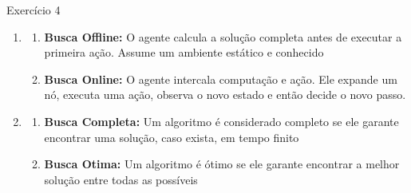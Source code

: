 \documentclass[a4paper,11pt]{article}
\theoremstyle{definition}
\theoremstyle{plain}
\theoremstyle{remark}
\newcounter{questao}[section]
\begin{document}
\begin{questaoManually}{Exercício 4}
\begin{enumerate}[label=\Alph*]
    \item
    \begin{enumerate}[label=\arabic*.]
      \item \textbf{Busca Offline:} O agente calcula a solução completa antes de executar a primeira ação. Assume um ambiente estático e conhecido
      \item \textbf{Busca Online:} O agente intercala computação e ação. Ele expande um nó, executa uma ação, observa o novo estado e então decide o novo passo.
    \end{enumerate}

    \item
    \begin{enumerate}[label=\arabic*.]
      \item \textbf{Busca Completa:} Um algoritmo é considerado completo se ele garante encontrar uma solução, caso exista, em tempo finito
      \item \textbf{Busca Otima:} Um algoritmo é ótimo se ele garante encontrar a melhor solução entre todas as possíveis
    \end{enumerate}
  \end{enumerate}
\end{questaoManually}

    

    
\end{document}
